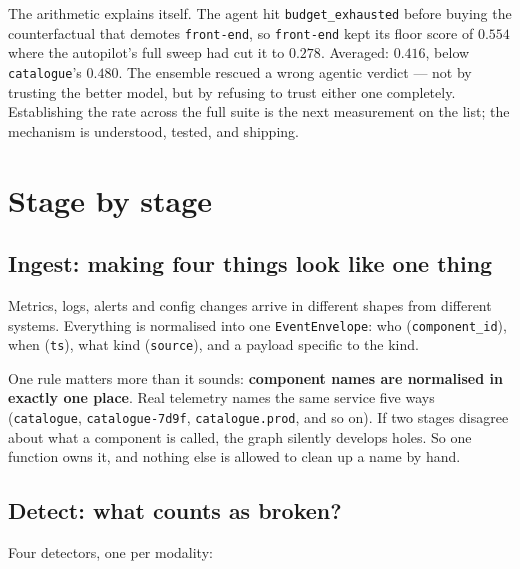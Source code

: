 \documentclass[11pt,a4paper]{article}
\newcommand{\code}[1]{\texttt{\small #1}}
\begin{document}
\noindent
The arithmetic explains itself. The agent hit \code{budget\_exhausted} before
buying the counterfactual that demotes \code{front-end}, so \code{front-end} kept
its floor score of $0.554$ where the autopilot's full sweep had cut it to $0.278$.
Averaged: $0.416$, below \code{catalogue}'s $0.480$. The ensemble rescued a wrong
agentic verdict --- not by trusting the better model, but by refusing to trust
either one completely. Establishing the rate across the full suite is the next
measurement on the list; the mechanism is understood, tested, and shipping.

\section{Stage by stage}

\subsection{Ingest: making four things look like one thing}

Metrics, logs, alerts and config changes arrive in different shapes from
different systems. Everything is normalised into one \code{EventEnvelope}:
who (\code{component\_id}), when (\code{ts}), what kind (\code{source}), and a
payload specific to the kind.

One rule matters more than it sounds: \textbf{component names are normalised in
exactly one place}. Real telemetry names the same service five ways
(\code{catalogue}, \code{catalogue-7d9f}, \code{catalogue.prod}, and so on). If
two stages disagree about what a component is called, the graph silently
develops holes. So one function owns it, and nothing else is allowed to clean up
a name by hand.

\subsection{Detect: what counts as broken?}

Four detectors, one per modality:
\end{document}
